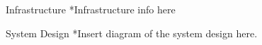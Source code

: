 \begin{block}{Infrastructure}
*Infrastructure info here
\end{block}

\vspace{1ex}

\begin{block}{System Design}
*Insert diagram of the system design here.
\end{block}
